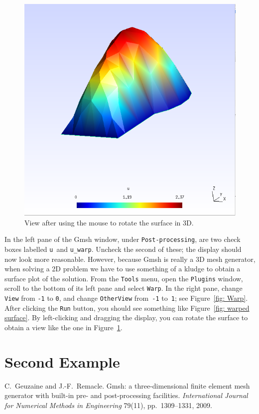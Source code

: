 \documentclass[a4paper,12pt]{article}
\begin{document}
\begin{figure}
\caption{View after using the mouse to rotate the surface in 3D.}
\label{fig: 3D view}
\begin{center}
\includegraphics[scale=0.4]{images/3Dview.png}
\end{center}
\end{figure}

In the left pane of the Gmsh window, under \verb!Post-processing!, 
are two check boxes labelled \verb!u!~and \verb!u_warp!.
Uncheck the second of these; the display should now look more 
reasonable.  However, because Gmsh is really a 3D mesh generator, 
when solving a 2D problem we have to use something 
of a kludge to obtain a surface plot of the solution.  From the 
\verb!Tools! menu, open the \verb!Plugins! window,  
scroll to the bottom of its left pane and select \verb!Warp!.  In the 
right pane, change \verb!View! from \verb!-1! to \verb!0!, and change 
\verb!OtherView! from~\verb!-1! to~\verb!1!; see Figure~\ref{fig: 
Warp}.  After clicking the \verb!Run! button, you should see something 
like Figure~\ref{fig: warped surface}.  By left-clicking and dragging 
the display, you can rotate the surface to obtain a view like the one 
in Figure~\ref{fig: 3D view}.

\section*{Second Example}
\begin{thebibliography}{0}
C.~Geuzaine and J.-F.~Remacle. Gmsh: a three-dimensional finite 
element mesh generator with built-in pre- and post-processing 
facilities. \emph{International Journal for Numerical Methods in 
Engineering} 79(11), pp.~1309--1331, 2009.
\end{thebibliography}
\end{document}

